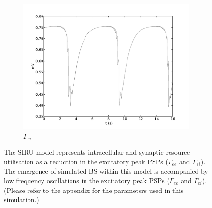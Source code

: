 \documentclass[a4paper,12pt]{article}
\begin{document}
\begin{figure}
\begin{subfigure}[b]{0.5\textwidth}
		\includegraphics[scale=0.35]{frontiers-2012-images-revised/biphasic-gamma_yml-00460_ode-burst-psp-res_yml-mod-res-0_9-2-1-1_yml-T_ei-intra.pdf}
		\caption{$\Gamma_{ei}$}
	\end{subfigure}
      \label{fig:emerging_slow_intra}
	\caption{The SIRU model represents intracellular and synaptic resource utilisation as a reduction in the excitatory peak PSPs ($\Gamma_{ee}$ and $\Gamma_{ei}$). The emergence of simulated BS within this model is accompanied by low frequency oscillations in the excitatory peak PSPs ($\Gamma_{ee}$ and $\Gamma_{ei}$). 
	(Please refer to the appendix for the parameters used in this simulation.)}
\end{figure}
\end{document}
